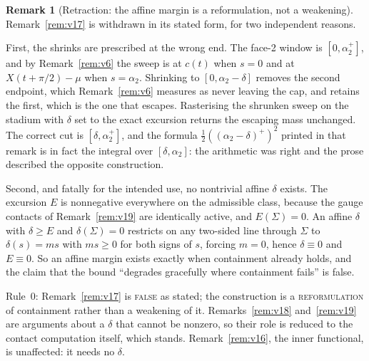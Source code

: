 \documentclass[11pt]{article}
\theoremstyle{definition}
\newtheorem{remark}[theorem]{Remark}
\newcommand{\Sig}{\Sigma}
\begin{document}
\begin{remark}[Retraction: the affine margin is a reformulation, not a weakening]\label{rem:v23}
Remark~\ref{rem:v17} is withdrawn in its stated form, for two independent reasons.

First, the shrinks are prescribed at the wrong end. The face-2 window is $[0,\alpha_2^+]$, and
by Remark~\ref{rem:v6} the sweep is at $c(t)$ when $s=0$ and at $X(t+\pi/2)-\mu$ when
$s=\alpha_2$. Shrinking to $[0,\alpha_2-\delta]$ removes the second endpoint, which
Remark~\ref{rem:v6} measures as never leaving the cap, and retains the first, which is the one
that escapes. Rasterising the shrunken sweep on the stadium with $\delta$ set to the exact
excursion returns the escaping mass unchanged. The correct cut is $[\delta,\alpha_2^+]$, and
the formula $\tfrac12((\alpha_2-\delta)^+)^2$ printed in that remark is in fact the integral
over $[\delta,\alpha_2]$: the arithmetic was right and the prose described the opposite
construction.

Second, and fatally for the intended use, no nontrivial affine $\delta$ exists. The excursion
$E$ is nonnegative everywhere on the admissible class, because the gauge contacts of
Remark~\ref{rem:v19} are identically active, and $E(\Sig)=0$. An affine $\delta$ with
$\delta\ge E$ and $\delta(\Sig)=0$ restricts on any two-sided line through $\Sig$ to
$\delta(s)=ms$ with $ms\ge0$ for both signs of $s$, forcing $m=0$, hence $\delta\equiv0$ and
$E\equiv0$. So an affine margin exists exactly when containment already holds, and the claim
that the bound ``degrades gracefully where containment fails'' is false.

Rule~0: Remark~\ref{rem:v17} is \textsc{false} as stated; the construction is a
\textsc{reformulation} of containment rather than a weakening of it. Remarks~\ref{rem:v18}
and~\ref{rem:v19} are arguments about a $\delta$ that cannot be nonzero, so their role is
reduced to the contact computation itself, which stands. Remark~\ref{rem:v16}, the inner
functional, is unaffected: it needs no $\delta$.
\end{remark}
\end{document}
